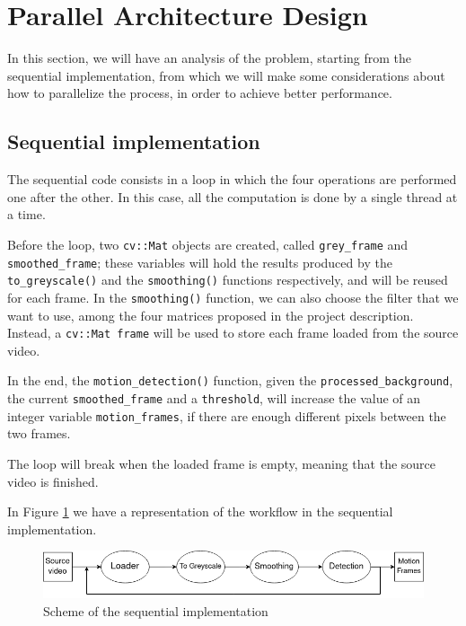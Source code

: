 \section{Parallel Architecture Design}
In this section, we will have an analysis of the problem, starting from the sequential implementation, from which we will make some considerations about how to parallelize the process, in order to achieve better performance.

\subsection{Sequential implementation}
The sequential code consists in a loop in which the four operations are performed one after the other. In this case, all the computation is done by a single thread at a time.

Before the loop, two \texttt{cv::Mat} objects are created, called \texttt{grey\_frame} and \texttt{smoothed\_frame}; these variables will hold the results produced by the \texttt{to\_greyscale()} and the \texttt{smoothing()} functions respectively, and will be reused for each frame.
In the \texttt{smoothing()} function, we can also choose the filter that we want to use, among the four matrices proposed in the project description.\\
Instead, a \texttt{cv::Mat frame} will be used to store each frame loaded from the source video.

In the end, the \texttt{motion\_detection()} function, given the \texttt{processed\_background}, the current \texttt{smoothed\_frame} and a \texttt{threshold}, will increase the value of an integer variable \texttt{motion\_frames}, if there are enough different pixels between the two frames.

The loop will break when the loaded frame is empty, meaning that the source video is finished.

In Figure \ref{fig:seq_code} we have a representation of the workflow in the sequential implementation.

\begin{figure}[h]
    \includegraphics[width=\textwidth]{img/seq_code.png}
    \centering
    \caption{Scheme of the sequential implementation}
    \label{fig:seq_code}
\end{figure}

